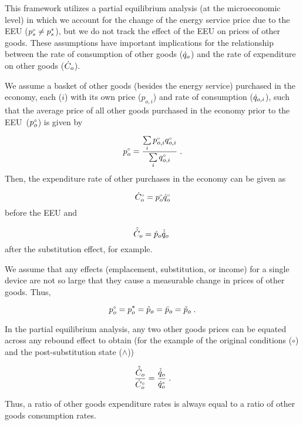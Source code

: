 

This framework utilizes
a partial equilibrium analysis (at the microeconomic level)
in which we account for the change of the energy service price
due to the EEU (${}{p}^{\scriptscriptstyle \circ}_s \neq {p}^*_s$), but 
we do not track the effect of the EEU on prices of other goods.
These assumptions have important implications for the relationship between 
the rate of consumption of other goods ($\dot{q}_o$) and 
the rate of expenditure on other goods ($\dot{C}_o$).

We assume a basket of other goods (besides the energy service) 
purchased in the economy,
each ($i$) with its own price ($p_{o,i}$) and rate of consumption ($\dot{q}_{o,i}$),
such that the average price of all other goods purchased in the economy
prior to the EEU~(${}{p}^{\scriptscriptstyle \circ}_o$) is given by

\begin{equation}
  {}{p}^{\scriptscriptstyle \circ}_o = \frac{\sum\limits_i {}{p}^{\scriptscriptstyle \circ}_{o,i} {}{q}^{\scriptscriptstyle \circ}_{o,i}}{\sum\limits_i {}{q}^{\scriptscriptstyle \circ}_{o,i}} \; .
\end{equation}
%
Then, the expenditure rate of other purchases in the economy can be given as

\begin{equation}
  {}{\dot{C}}^{\scriptscriptstyle \circ}_o = {}{p}^{\scriptscriptstyle \circ}_o {}{\dot{q}}^{\scriptscriptstyle \circ}_o
\end{equation}
%
before the EEU and

\begin{equation}
  \hat{\dot{C}}_o = \hat{p}_o \hat{\dot{q}}_o \; 
\end{equation}
%
after the substitution effect, for example.

We assume that any effects (emplacement, substitution, or income)
for a single device 
are not so large that they 
cause a measurable change in prices of other goods. 
Thus, 

\begin{equation}
  {}{p}^{\scriptscriptstyle \circ}_o = {p}^*_o = \hat{p}_o = \bar{p}_o = \tilde{p}_o \; .
\end{equation}

In the partial equilibrium analysis, 
any two other goods prices can be equated 
across any rebound effect
to obtain
(for the example of the original conditions ($\circ$) 
and the post-substitution state ($\wedge$))

\begin{equation} \label{eq:qo_Co_equality}
  \frac{\hat{\dot{C}}_o}{{}{\dot{C}}^{\scriptscriptstyle \circ}_o} 
      = \frac{\hat{\dot{q}}_o}{{}{\dot{q}}^{\scriptscriptstyle \circ}_o} \; .
\end{equation}

Thus, a ratio of other goods expenditure rates
is always equal to a ratio of other goods consumption rates.









